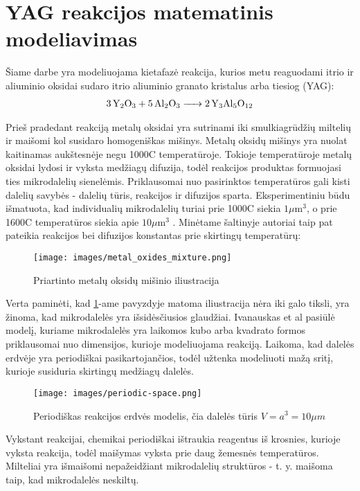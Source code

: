 \section{YAG reakcijos matematinis modeliavimas}

Šiame darbe yra modeliuojama kietafazė reakcija, kurios metu reaguodami itrio ir aliuminio oksidai sudaro itrio aliuminio granato kristalus arba tiesiog (YAG):
\begin{align*}
  \ce{3Y_2O_3 + 5Al_2O_3 -> 2Y_3Al_5O_12}
\end{align*}

Prieš pradedant reakciją metalų oksidai yra sutrinami iki smulkiagrūdžių miltelių ir maišomi kol susidaro homogeniškas mišinys. Metalų oksidų mišinys yra nuolat kaitinamas aukštesnėje negu 1000\degree C temperatūroje. Tokioje temperatūroje metalų oksidai lydosi ir vyksta medžiagų difuzija, todėl reakcijos produktas formuojasi ties mikrodalelių sienelėmis. Priklausomai nuo pasirinktos temperatūros gali kisti dalelių savybės - dalelių tūris, reakcijos ir difuzijos sparta. Eksperimentiniu būdu išmatuota, kad individualių mikrodalelių turiai prie 1000\degree C siekia $1\mu \text{m}^3$, o prie 1600\degree C temperatūros siekia apie $10\mu\text{m}^3$ \cite{ivanauskasComputationalModellingYAG2009}. Minėtame šaltinyje autoriai taip pat pateikia reakcijos bei difuzijos konstantas prie skirtingų temperatūrų:

\begin{figure}[h]
  \centering
  \texttt{[image: images/metal\_oxides\_mixture.png]}
  \caption{Priartinto metalų oksidų mišinio iliustracija \cite{ivanauskasComputationalModellingYAG2009}}
  \label{fig:metal-oxides-mixuter}
\end{figure}

Verta paminėti, kad \ref{fig:metal-oxides-mixuter}-ame pavyzdyje matoma iliustracija nėra iki galo tiksli, yra žinoma, kad mikrodalelės yra išsidėsčiusios glaudžiai.
\cite{ivanauskasModellingSolidState2005} Ivanauskas et al pasiūlė modelį, kuriame mikrodalelės yra laikomos kubo arba kvadrato formos priklausomai nuo dimensijos, kurioje modeliuojama reakciją. Laikoma, kad dalelės erdvėje yra periodiškai pasikartojančios, todėl užtenka modeliuoti mažą sritį, kurioje susiduria skirtingų medžiagų dalelės. 

\begin{figure}[h]
  \centering
  \texttt{[image: images/periodic-space.png]}
  \caption{Periodiškas reakcijos erdvės modelis, čia dalelės tūris $V=a^3=10\mu m$ \cite{ivanauskasComputationalModellingYAG2009}}
  \label{fig:periodic-space}
\end{figure}

Vykstant reakcijai, chemikai periodiškai ištraukia reagentus iš krosnies, kurioje vyksta reakcija, todėl maišymas vyksta prie daug žemesnės temperatūros. Milteliai yra išmaišomi nepažeidžiant mikrodalelių struktūros - t. y. maišoma taip, kad mikrodalelės neskiltų.